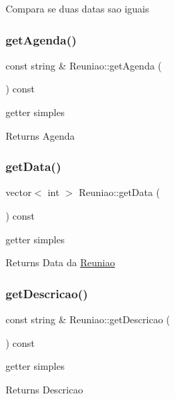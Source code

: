 Compara se duas datas sao iguais \hypertarget{class_reuniao_ac74333d543eb7ef5f9042b9111e3eac1}{}\label{class_reuniao_ac74333d543eb7ef5f9042b9111e3eac1} 
\subsubsection{\texorpdfstring{get\+Agenda()}{getAgenda()}}
{\footnotesize\ttfamily const string \& Reuniao\+::get\+Agenda (\begin{DoxyParamCaption}{ }\end{DoxyParamCaption}) const}

getter simples \begin{DoxyReturn}{Returns}
Agenda 
\end{DoxyReturn}
\hypertarget{class_reuniao_af88fe0e1665a47c34e72ed90b84f785e}{}\label{class_reuniao_af88fe0e1665a47c34e72ed90b84f785e} 
\subsubsection{\texorpdfstring{get\+Data()}{getData()}}
{\footnotesize\ttfamily vector$<$ int $>$ Reuniao\+::get\+Data (\begin{DoxyParamCaption}{ }\end{DoxyParamCaption}) const}

getter simples \begin{DoxyReturn}{Returns}
Data da \hyperlink{class_reuniao}{Reuniao} 
\end{DoxyReturn}
\hypertarget{class_reuniao_a2d373c8189382b2eeafbecbdb8f5e0d0}{}\label{class_reuniao_a2d373c8189382b2eeafbecbdb8f5e0d0} 
\subsubsection{\texorpdfstring{get\+Descricao()}{getDescricao()}}
{\footnotesize\ttfamily const string \& Reuniao\+::get\+Descricao (\begin{DoxyParamCaption}{ }\end{DoxyParamCaption}) const}

getter simples \begin{DoxyReturn}{Returns}
Descricao 
\end{DoxyReturn}
\hypertarget{class_reuniao_a8baeb122e48d0f90cba40407f97e278e}{}\label{class_reuniao_a8baeb122e48d0f90cba40407f97e278e} 
